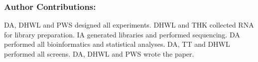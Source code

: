 \documentclass[10pt,letterpaper,twocolumn]{article}
\begin{document}
\subsubsection*{Author Contributions:}
DA, DHWL and PWS designed all experiments. DHWL and THK collected RNA for library preparation. IA generated libraries and performed sequencing. DA performed all bioinformatics and statistical analyses. DA, TT and DHWL performed all screens. DA, DHWL and PWS wrote the paper.


\nolinenumbers{}




\end{document}
